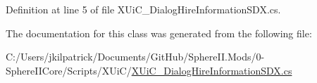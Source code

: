 Definition at line 5 of file X\+Ui\+C\+\_\+\+Dialog\+Hire\+Information\+S\+D\+X.\+cs.



The documentation for this class was generated from the following file\+:\begin{DoxyCompactItemize}
\item 
C\+:/\+Users/jkilpatrick/\+Documents/\+Git\+Hub/\+Sphere\+I\+I.\+Mods/0-\/\+Sphere\+I\+I\+Core/\+Scripts/\+X\+Ui\+C/\mbox{\hyperlink{_x_ui_c___dialog_hire_information_s_d_x_8cs}{X\+Ui\+C\+\_\+\+Dialog\+Hire\+Information\+S\+D\+X.\+cs}}\end{DoxyCompactItemize}
